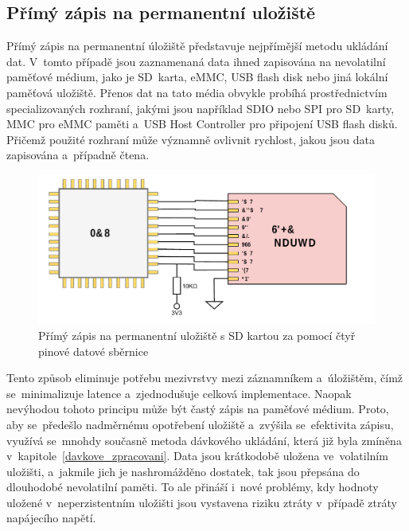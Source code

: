 \subsection{Přímý zápis na permanentní uložiště}
Přímý zápis na permanentní úložiště představuje nejpřímější metodu ukládání dat. V~tomto případě jsou zaznamenaná data ihned zapisována na nevolatilní paměťové médium, jako je SD~karta, eMMC, USB flash disk nebo jiná lokální paměťová uložiště. Přenos dat na tato média obvykle probíhá prostřednictvím specializovaných rozhraní, jakými jsou například SDIO nebo SPI pro SD~karty, MMC pro eMMC paměti a~USB Host Controller pro připojení USB flash disků. Přičemž použité rozhraní může významně ovlivnit rychlost, jakou jsou data zapisována a~případně čtena.~\cite{datalogger_sd_mmc_usb_flash_disk, perny2008zarizeni_cas_znacky}

\begin{figure}[h]
    \centering
    \includegraphics[width=1.00\textwidth]{obrazky-figures/forward_write.pdf}
    
    \caption{Přímý zápis na permanentní uložiště s SD kartou za pomocí čtyř pinové datové sběrnice}
    \label{fig:forward-write}
\end{figure}

Tento způsob eliminuje potřebu mezivrstvy mezi záznamníkem a~úložištěm, čímž se~minimalizuje latence a~zjednodušuje celková implementace. Naopak nevýhodou tohoto principu může být častý zápis na paměťové médium. Proto, aby se~předešlo nadměrnému opotřebení uložiště a~zvýšila se~efektivita zápisu, využívá se~mnohdy současně metoda dávkového ukládání, která již byla zmíněna v~kapitole~\ref{davkove_zpracovani}. Data jsou krátkodobě uložena ve~volatilním uložišti, a~jakmile jich je nashromážděno dostatek, tak jsou přepsána do dlouhodobé nevolatilní paměti. To ale přináší i~nové problémy, kdy hodnoty uložené v~neperzistentním uložišti jsou vystavena riziku ztráty v~případě ztráty napájecího napětí.~\cite{ieee_digital_sound_recorder_arm_sd_card}

